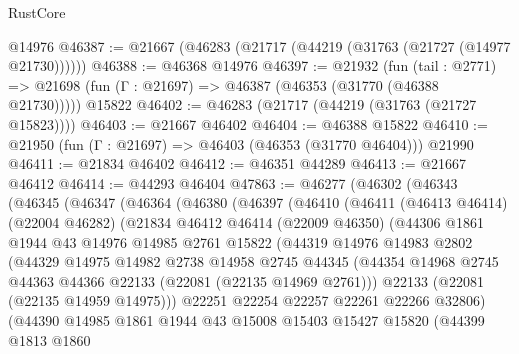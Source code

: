 \begin{lexlean}{RustCore}
\begin{coremodule}
    @14976
@46387 := @21667 (@46283 (@21717 (@44219 (@31763 (@21727 (@14977 @21730))))))
@46388 := @46368 @14976
@46397 := @21932
    (fun (tail : @2771) => @21698 (fun (Γ : @21697) => @46387 (@46353 (@31770 (@46388 @21730)))))
    @15822
@46402 := @46283 (@21717 (@44219 (@31763 (@21727 @15823))))
@46403 := @21667 @46402
@46404 := @46388 @15822
@46410 := @21950 (fun (Γ : @21697) => @46403 (@46353 (@31770 @46404))) @21990
@46411 := @21834 @46402
@46412 := @46351 @44289
@46413 := @21667 @46412
@46414 := @44293 @46404
@47863 := @46277
    (@46302
      (@46343
        (@46345
          (@46347
            (@46364
              (@46380
                (@46397
                  (@46410
                    (@46411
                      (@46413 @46414)
                      (@22004 @46282)
                      (@21834
                        @46412
                        @46414
                        (@22009 @46350)
                        (@44306
                          @1861
                          @1944
                          @43
                          @14976
                          @14985
                          @2761
                          @15822
                          (@44319
                            @14976
                            @14983
                            @2802
                            (@44329
                              @14975
                              @14982
                              @2738
                              @14958
                              @2745
                              @44345
                              (@44354
                                @14968
                                @2745
                                @44363
                                @44366
                                @22133
                                (@22081 (@22135 @14969 @2761)))
                              @22133
                              (@22081 (@22135 @14959 @14975)))
                            @22251
                            @22254
                            @22257
                            @22261
                            @22266
                            @32806)
                          (@44390
                            @14985
                            @1861
                            @1944
                            @43
                            @15008
                            @15403
                            @15427
                            @15820
                            (@44399
                              @1813
                              @1860

\end{coremodule}
\end{lexlean}
